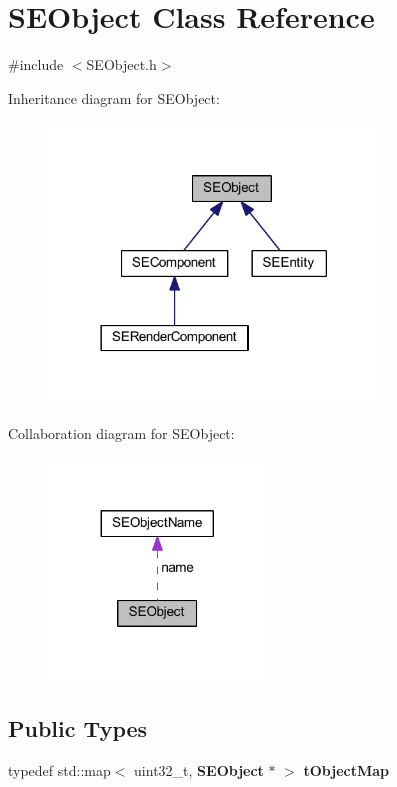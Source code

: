 \section{S\+E\+Object Class Reference}
\label{class_s_e_object}


{\ttfamily \#include $<$S\+E\+Object.\+h$>$}



Inheritance diagram for S\+E\+Object\+:
\nopagebreak
\begin{figure}[H]
\begin{center}
\leavevmode
\includegraphics[width=249pt]{class_s_e_object__inherit__graph}
\end{center}
\end{figure}


Collaboration diagram for S\+E\+Object\+:
\nopagebreak
\begin{figure}[H]
\begin{center}
\leavevmode
\includegraphics[width=164pt]{class_s_e_object__coll__graph}
\end{center}
\end{figure}
\subsection*{Public Types}
\begin{DoxyCompactItemize}
\item 
typedef std\+::map$<$ uint32\+\_\+t, {\bf S\+E\+Object} $\ast$ $>$ {\bf t\+Object\+Map}
\end{DoxyCompactItemize}
